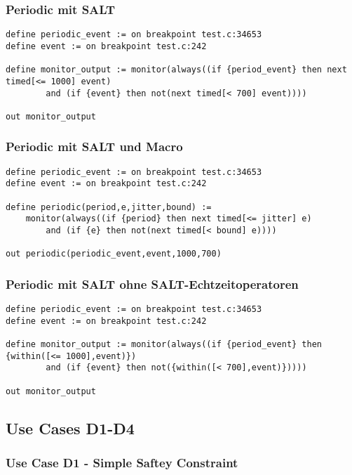 \subsubsection{Periodic mit SALT}

\begin{lstlisting}
define periodic_event := on breakpoint test.c:34653
define event := on breakpoint test.c:242

define monitor_output := monitor(always((if {period_event} then next timed[<= 1000] event) 
	    and (if {event} then not(next timed[< 700] event))))

out monitor_output
\end{lstlisting}

\subsubsection{Periodic mit SALT und Macro}

\begin{lstlisting}
define periodic_event := on breakpoint test.c:34653
define event := on breakpoint test.c:242

define periodic(period,e,jitter,bound) := 
    monitor(always((if {period} then next timed[<= jitter] e) 
	    and (if {e} then not(next timed[< bound] e))))

out periodic(periodic_event,event,1000,700)
\end{lstlisting}


\subsubsection{Periodic mit SALT ohne SALT-Echtzeitoperatoren}

\begin{lstlisting}
define periodic_event := on breakpoint test.c:34653
define event := on breakpoint test.c:242

define monitor_output := monitor(always((if {period_event} then {within([<= 1000],event)}) 
	    and (if {event} then not({within([< 700],event)}))))

out monitor_output
\end{lstlisting}

\subsection{Use Cases D1-D4}

\subsubsection{Use Case D1 - Simple Saftey Constraint}

